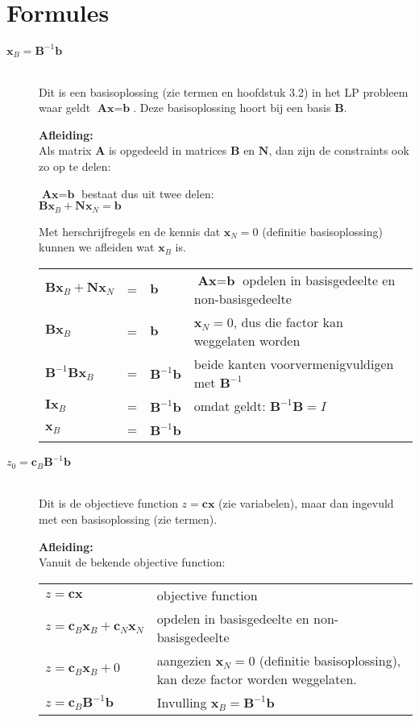 \documentclass[10pt,a4paper]{article}
\begin{document}
\section*{Formules}
\begin{description}
\item[$\textbf{x}_B = \textbf{B}^{-1}\textbf{b}$] \hfill \\
Dit is een basisoplossing (zie termen en hoofdstuk 3.2) in het LP probleem waar geldt $\textbf{Ax} = \textbf{b}$.
Deze basisoplossing hoort bij een basis $\textbf{B}$.

\textbf{Afleiding:} \\
Als matrix $\textbf{A}$ is opgedeeld in matrices $\textbf{B}$ en $\textbf{N}$, dan zijn de constraints ook zo op te delen:

$\textbf{Ax} = \textbf{b}$ bestaat dus uit twee delen: \\
$\textbf{Bx}_B + \textbf{Nx}_N = \textbf{b}$

Met herschrijfregels en de kennis dat $\textbf{x}_N = 0$ (definitie basisoplossing) kunnen we afleiden wat $\textbf{x}_B$ is.

\begin{tabular}{l l l l}
$\textbf{Bx}_B + \textbf{Nx}_N$ & = & $\textbf{b}$ & $\textbf{Ax} = \textbf{b}$ opdelen in basisgedeelte en non-basisgedeelte \\
$\textbf{Bx}_B$ & = & $\textbf{b}$ &  $\textbf{x}_N = 0$, dus die factor kan weggelaten worden \\ 
$\textbf{B}^ {-1}\textbf{Bx}_B$ & = & $\textbf{B}^ {-1}\textbf{b}$ & beide kanten voorvermenigvuldigen met $\textbf{B}^{-1}$ \\
$\textbf{Ix}_B$ & = & $\textbf{B}^ {-1}\textbf{b}$ & omdat geldt: $\textbf{B}^{-1}\textbf{B} = I$ \\
$\textbf{x}_B$ & = & $\textbf{B}^{-1}\textbf{b}$ & \\
\end{tabular}


\item[$z_0 = \textbf{c}_B\textbf{B}^{-1}\textbf{b}$] \hfill \\
Dit is de objectieve function $z = \textbf{cx}$ (zie variabelen), maar dan ingevuld met een basisoplossing (zie termen).

\textbf{Afleiding:} \\
Vanuit de bekende objective function:

\begin{tabular}{l l}
$z = \textbf{cx}$ & objective function \\
$z = \textbf{c}_B\textbf{x}_B + \textbf{c}_N\textbf{x}_N$ & opdelen in basisgedeelte en non-basisgedeelte \\
$z = \textbf{c}_B\textbf{x}_B + 0$ & aangezien $\textbf{x}_N = 0$ (definitie basisoplossing), kan deze factor worden weggelaten. \\
$z = \textbf{c}_B\textbf{B}^{-1}\textbf{b}$ & Invulling $\textbf{x}_B = \textbf{B}^{-1}\textbf{b}$
\end{tabular}




\end{description}
\end{document}
